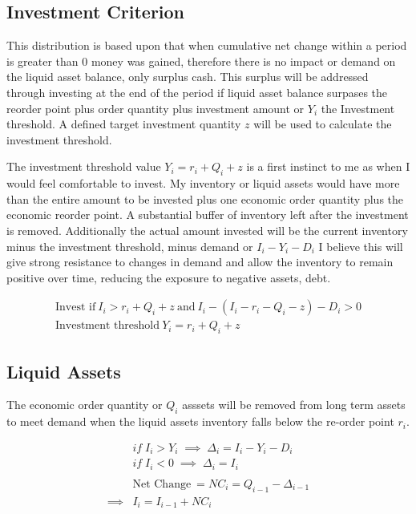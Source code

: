 \documentclass{article}
\begin{document}
\subsection{Investment Criterion}
This distribution is based upon that when cumulative net change within a period is greater than 0 money was gained, therefore there is no impact or demand on the liquid asset balance, only surplus cash. This surplus will be addressed through investing at the end of the period if liquid asset balance surpases the reorder point plus order quantity plus investment amount or $Y_{i}$ the Investment threshold. A defined target investment quantity $z$ will be used to calculate the investment threshold. 

The investment threshold value  $Y_{i} =  r_{i} + Q_{i} + z$  is a first instinct to me as when I would feel comfortable to invest. My inventory or liquid assets would have more than the entire amount to be invested plus one economic order quantity plus the economic reorder point. A substantial buffer of inventory left after the investment is removed. Additionally the actual amount invested will be the current inventory minus the investment threshold, minus demand or $I_{i} - Y_{i} - D_{i}$  I believe this will give strong resistance to changes in demand and allow the inventory to remain positive over time, reducing the exposure to negative assets, debt. 

\begin{equation}
	\begin{split}
		\text{Invest if} \: I_{i} > r_{i} + Q_{i} + z \:\text{and} \: I_{i} - ( I_{i} - r_{i} - Q_{i} - z) - D_{i} > 0 \\
		\text{Investment threshold} \: Y_{i} =  r_{i} + Q_{i} + z 
	\end{split}
\end{equation}

\subsection{Liquid Assets}
The economic order quantity or $Q_{i}$  asssets will be removed from long term assets to meet demand when the liquid assets inventory falls below the re-order point $r_{i}$.

\begin{align*}
	& if \; I_{i} > Y_{i} \;\implies\;	 \Delta_{i} = I_{i} - Y_{i} - D_{i}\\
	& if \; I_{i} < 0 \;\implies\; 	 \Delta_{i} = I_{i}\\ 
	\\
	& \text{Net Change} \: = NC_{i}= Q_{i-1} - \Delta_{i-1}\\
										\implies & I_{i} = I_{i-1} + NC_{i}\\
\end{align*}
\end{document}
